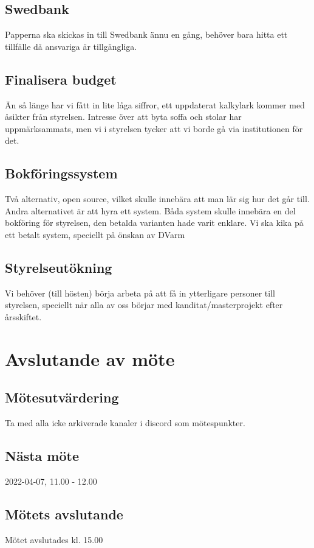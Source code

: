 \documentclass[protokoll]{dvd}
\begin{document}
    \subsection*{Swedbank}
    Papperna ska skickas in till Swedbank ännu en gång, behöver bara hitta ett tillfälle då ansvariga är tillgängliga.

    \subsection*{Finalisera budget}
    Än så länge har vi fått in lite låga siffror, ett uppdaterat kalkylark kommer med åsikter från styrelsen. Intresse över att byta soffa och stolar har uppmärksammats, men vi i styrelsen tycker att vi borde gå via institutionen för det.

    \subsection*{Bokföringssystem}
    Två alternativ, open source, vilket skulle innebära att man lär sig hur det går till. Andra alternativet är att hyra ett system. Båda system skulle innebära en del bokföring för styrelsen, den betalda varianten hade varit enklare. Vi ska kika på ett betalt system, speciellt på önskan av DVarm

    \subsection*{Styrelseutökning}
    Vi behöver (till hösten) börja arbeta på att få in ytterligare personer till styrelsen, speciellt när alla av oss börjar med kanditat/masterprojekt efter årsskiftet.

\newpage

\newpage

\newpage

\section{Avslutande av möte}

    \subsection{Mötesutvärdering}
    Ta med alla icke arkiverade kanaler i discord som mötespunkter.

    \subsection{Nästa möte}
    2022-04-07, 11.00 - 12.00

    \subsection{Mötets avslutande}
    Mötet avslutades kl. 15.00

\styrelsesignaturer
\end{document}
